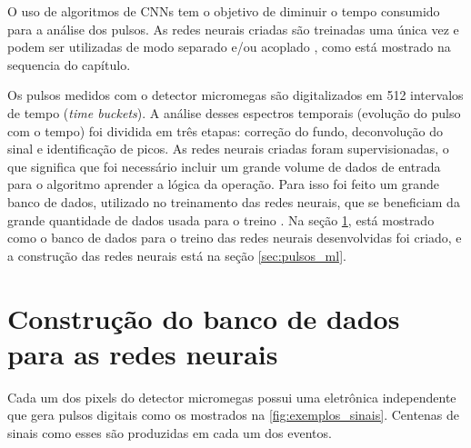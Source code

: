 \documentclass[a4paper,12pt,oneside]{book}
\begin{document}
\par O uso de algoritmos de CNNs tem o objetivo de diminuir o tempo consumido para a análise dos pulsos. As redes neurais criadas são treinadas uma única vez e podem ser utilizadas de modo separado e/ou acoplado \cite{FORTINO2022166497}, como está mostrado na sequencia do capítulo.

\par Os pulsos medidos com o detector micromegas são digitalizados em 512 intervalos de tempo (\textit{time buckets}). A análise desses espectros temporais (evolução do pulso com o tempo) foi dividida em três etapas: correção do fundo, deconvolução do sinal e identificação de picos. As redes neurais criadas foram supervisionadas, o que significa que foi necessário incluir um grande volume de dados de entrada para o algoritmo aprender a lógica da operação. Para isso foi feito um grande banco de dados, utilizado no treinamento das redes neurais, que se beneficiam da grande quantidade de dados usada para o treino \cite{mlbook}. Na seção \ref{sec:pulses_trad}, está mostrado como o banco de dados para o treino das redes neurais desenvolvidas foi criado, e a construção das redes neurais está na seção \ref{sec:pulsos_ml}.






\section{Construção do banco de dados para as redes neurais}\label{sec:pulses_trad}

\par Cada um dos pixels do detector micromegas possui uma eletrônica independente que gera pulsos digitais como os mostrados na \ref{fig:exemplos_sinais}. Centenas de sinais como esses são produzidas em cada um dos eventos.
\end{document}
